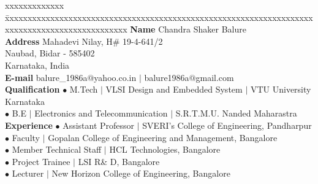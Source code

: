 \CV

\begin{tabbing}
xxxxxxxxxxxxx \= xxxxxxxxxxxxxxxxxxxxxxxxxxxxxxxxxxxxxxxxxxxxxxxxxxxxxxxxxxxxxxxxxxxxxxxxxxxxxxxxxxxxxxxxxxxxxxx \kill
\textbf{Name}   \> Chandra Shaker Balure \\
\textbf{Address}   \> Mahadevi Nilay, H\# 19-4-641/2 \\
				\> Naubad, Bidar - 585402 \\
				\> Karnataka, India \\
\textbf{E-mail}   \> balure\_1986a$@$yahoo.co.in $\mid$ balure1986a$@$gmail.com \\
\textbf{Qualification} \> $\bullet$ M.Tech $\mid$ VLSI Design and Embedded System $\mid$ VTU University Karnataka \\
				\> $\bullet$ B.E $\mid$ Electronics and Telecommunication $\mid$ S.R.T.M.U. Nanded Maharastra \\
\textbf{Experience} \> $\bullet$ Assistant Professor $\mid$ SVERI's College of Engineering, Pandharpur \\
				\> $\bullet$ Faculty $\mid$ Gopalan College of Engineering and Management, Bangalore \\
				\> $\bullet$ Member Technical Staff $\mid$ HCL Technologies, Bangalore \\
				\> $\bullet$ Project Trainee $\mid$ LSI R\& D, Bangalore \\
				\> $\bullet$ Lecturer $\mid$ New Horizon College of Engineering, Bangalore\\
\end{tabbing}